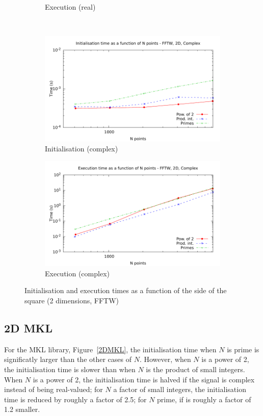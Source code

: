 \documentclass[12pt, a4paper]{article} \setlength{\textheight}{24cm}
\begin{document}
\begin{figure}[H]
\begin{subfigure}{.5\textwidth}
    \caption{Execution (real)}
    \label{2DFFTWR}
  \end{subfigure}\\
  \begin{subfigure}{.5\textwidth}
    \centering
    \includegraphics[width=.9\linewidth]{graphs/2d-fftw-init-c.pdf}
    \caption{Initialisation (complex)}
    \label{2DFFTWCI}
  \end{subfigure}%
  \begin{subfigure}{.5\textwidth}
    \centering
    \includegraphics[width=.9\linewidth]{graphs/2d-fftw-exec-c.pdf}
    \caption{Execution (complex)}
    \label{2DFFTWC}
  \end{subfigure}
  \caption{Initialisation and execution times as a function of the
    side of the square (2 dimensions, FFTW)}
  \label{2DFFTW}
\end{figure}



\subsection{2D MKL}
For the MKL library, Figure~\ref{2DMKL}, the initialisation time when
$N$ is prime is significatly larger than the other cases of $N.$
However, when $N$ is a power of 2, the initialisation time is slower
than when $N$ is the product of small integers. When $N$ is a power of
2, the initialisation time is halved if the signal is complex instead
of being real-valued; for $N$ a factor of small integers, the
initialisation time is reduced by roughly a factor of 2.5; for $N$
prime, if is roughly a factor of 1.2 smaller.
\end{document}
